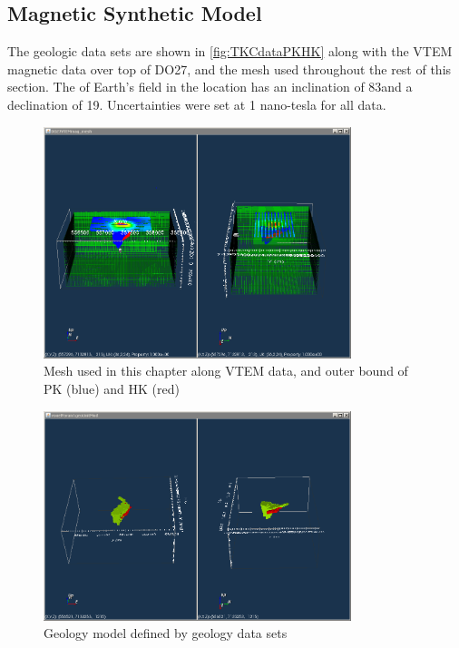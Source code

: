 
\subsection{Magnetic Synthetic Model }
\label{subsec:Synthetic Model:MAG:TKC}

The geologic data sets are shown in \autoref{fig:TKCdataPKHK} along with the VTEM magnetic data over top of DO27, and the mesh used throughout the rest of this section. The of Earth's field in the location has an inclination of 83\degree and a declination of 19\degree. Uncertainties were set at 1 nano-tesla for all data.
%
\begin{figure} [h]
   \centering
   \includegraphics[width=0.8\textwidth]{images/TKC/TKCdataPKHK.PNG}
   \caption{Mesh used in this chapter along VTEM data, and outer bound of PK (blue) and HK (red)}
   \label{fig:TKCdataPKHK}
\end{figure}
%

\begin{figure} [h]
   \centering
   \includegraphics[width=0.8\textwidth]{images/TKC/TKCgeoModel.PNG}
   \caption{Geology model defined by geology data sets}
   \label{fig:TKCgeoModel}
\end{figure}

